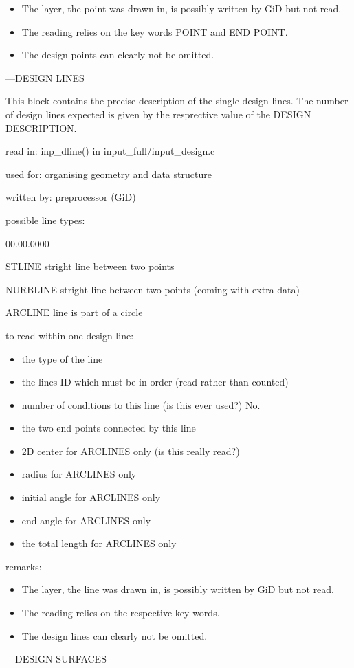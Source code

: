 \begin{itemize}
\item The layer, the point was drawn in, is possibly written by GiD but
not read. 
\item The reading relies on the key words POINT and END POINT. 
\item The design points can clearly not be omitted.
\end{itemize}
---DESIGN LINES

This block contains the precise description of the single design lines.
The number of design lines expected is given by the resprective value
of the DESIGN DESCRIPTION. 

read in: inp\_dline() in input\_full/input\_design.c 

used for: organising geometry and data structure 

written by: preprocessor (GiD) 

possible line types: 

\begin{lyxlist}{00.00.0000}
\item [{STLINE}] stright line between two points 
\item [{NURBLINE}] stright line between two points (coming with extra data) 
\item [{ARCLINE}] line is part of a circle 
\end{lyxlist}
to read within one design line: 

\begin{itemize}
\item the type of the line 
\item the lines ID which must be in order (read rather than counted) 
\item number of conditions to this line (is this ever used?) No.
\item the two end points connected by this line 
\item 2D center for ARCLINES only (is this really read?) 
\item radius for ARCLINES only 
\item initial angle for ARCLINES only 
\item end angle for ARCLINES only 
\item the total length for ARCLINES only 
\end{itemize}
remarks: 

\begin{itemize}
\item The layer, the line was drawn in, is possibly written by GiD but not
read. 
\item The reading relies on the respective key words. 
\item The design lines can clearly not be omitted.
\end{itemize}
---DESIGN SURFACES 

